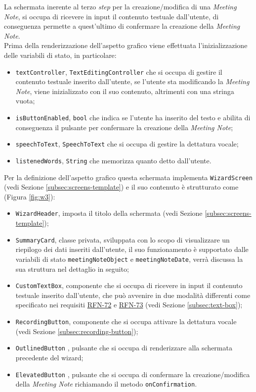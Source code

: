 La schermata inerente al terzo \emph{step} per la creazione/modifica di una \emph{Meeting Note}, si occupa di ricevere in input il contenuto testuale dall'utente, di conseguenza permette a quest'ultimo di confermare la creazione della \emph{Meeting Note}. \\
Prima della renderizzazione dell'aspetto grafico viene effettuata l'inizializzazione delle variabili di stato, in particolare:
\begin{itemize}
    \item \lstinline{textController}, \lstinline{TextEditingController} che si occupa di gestire il contenuto testuale inserito dall'utente, se l'utente sta modificando la \emph{Meeting Note}, viene inizializzato con il suo contenuto, altrimenti con una stringa vuota;
    \item \lstinline{isButtonEnabled}, \lstinline{bool} che indica se l'utente ha inserito del testo e abilita di conseguenza il pulsante per confermare la creazione della \emph{Meeting Note};
    \item \lstinline{speechToText}, \lstinline{SpeechToText} che si occupa di gestire la dettatura vocale;
    \item \lstinline{listenedWords}, \lstinline{String} che memorizza quanto detto dall'utente.
\end{itemize}
Per la definizione dell'aspetto grafico questa schermata implementa \lstinline{WizardScreen} (vedi Sezione \ref{subsec:screens-template}) e il suo contenuto è strutturato come  (Figura \ref{fig:w3}):
\begin{itemize}
    \item \lstinline{WizardHeader}, imposta il titolo della schermata (vedi Sezione \ref{subsec:screens-template});
    \item \lstinline{SummaryCard}, classe privata, sviluppata con lo scopo di visualizzare un riepilogo dei dati inseriti dall'utente, il suo funzionamento è supportato dalle variabili di stato \lstinline{meetingNoteObject} e \lstinline{meetingNoteDate}, verrà discussa la sua struttura nel dettaglio in seguito;
    \item \lstinline{CustomTextBox}, componente che si occupa di ricevere in input il contenuto testuale inserito dall'utente, che può avvenire in due modalità differenti come specificato nei requisiti \hyperref[RFN-72]{RFN-72} e \hyperref[RFN-73]{RFN-73} (vedi Sezione \ref{subsec:text-box});
    \item \lstinline{RecordingButton}, componente che si occupa attivare la dettatura vocale (vedi Sezione \ref{subsec:recording-button});
    \item \lstinline{OutlinedButton} \cite{site:outline-button}, pulsante che si occupa di renderizzare alla schermata precedente del \gls{wizard}\glsoccur;
    \item \lstinline{ElevatedButton} \cite{site:elevated-button}, pulsante che si occupa di confermare la creazione/modifica della \emph{Meeting Note} richiamando il metodo \lstinline{onConfirmation}.
\end{itemize}
